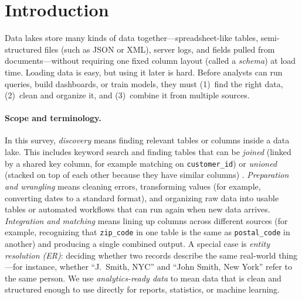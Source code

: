 \documentclass[sigconf,nonacm]{acmart}
\begin{document}




\maketitle

\section{Introduction}
Data lakes store many kinds of data together---spreadsheet-like tables, semi-structured files (such as JSON or XML), server logs, and fields pulled from documents---without requiring one fixed column layout (called a \emph{schema}) at load time.
Loading data is easy, but using it later is hard.
Before analysts can run queries, build dashboards, or train models, they must (1)~find the right data, (2)~clean and organize it, and (3)~combine it from multiple sources.

\paragraph{Scope and terminology.}
In this survey, \emph{discovery} means finding relevant tables or columns inside a data lake. This includes keyword search and finding tables that can be \emph{joined} (linked by a shared key column, for example matching on \texttt{customer\_id}) or \emph{unioned} (stacked on top of each other because they have similar columns) \cite{10.1145/3555041.3589409,10.14778/3750601.3750694}. \emph{Preparation and wrangling} means cleaning errors, transforming values (for example, converting dates to a standard format), and organizing raw data into usable tables or automated workflows that can run again when new data arrives. \emph{Integration and matching} means lining up columns across different sources (for example, recognizing that \texttt{zip\_code} in one table is the same as \texttt{postal\_code} in another) and producing a single combined output. A special case is \emph{entity resolution (ER)}: deciding whether two records describe the same real-world thing---for instance, whether ``J.\ Smith, NYC'' and ``John Smith, New York'' refer to the same person. We use \emph{analytics-ready data} to mean data that is clean and structured enough to use directly for reports, statistics, or machine learning.
\end{document}
